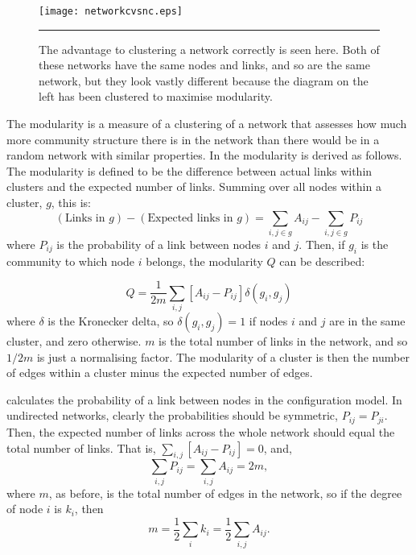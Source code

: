 \begin{figure}[htb]
  \centering
  \texttt{[image: networkcvsnc.eps]}
  \bigskip
  \rule{35em}{0.5pt}
  \caption{The advantage to clustering a network correctly is seen here.  Both 
    of these networks have the same nodes and links, and so are the same 
    network, but they look vastly different because the diagram on the left 
    has been clustered to maximise modularity.}
  \label{netclus}
\end{figure}

The modularity is a measure of a clustering of a network that assesses 
how much more community structure there is in the network than there would be 
in a random network with similar properties.  In \citep{Newman2006b,Newman2006a} the modularity is derived as follows. The modularity is defined to be the difference between actual links within clusters and the expected number of links.  Summing over all nodes within a cluster, $g$, this is:
\begin{equation}
(\text{Links in }g) - (\text{Expected links in }g) = \sum_{i,j \in g}  A_{ij} - \sum_{i,j \in g} P_{ij} 
\end{equation}
where $P_{ij}$ is the 
probability of a link between nodes $i$ and $j$. Then, if $g_i$ is the 
community to which node $i$ belongs, the modularity $Q$ can be described:

\begin{equation}
Q = \frac{1}{2m}\sum_{i,j}[A_{ij} - P_{ij}]\delta(g_i,g_j)
\end{equation}
where $\delta$ is the Kronecker delta, so $\delta(g_i,g_j)=1$ if nodes 
$i$ and $j$ are in the same cluster, and zero otherwise. $m$ is the total 
number of links in the network, and so $1/2m$ is just a normalising 
factor.  The modularity of a cluster is then the number of edges within a 
cluster minus the expected number of edges.

\citet{Newman2006b,Newman2006a} calculates the probability of a link between nodes in the configuration model.  In undirected networks, 
clearly the probabilities should be symmetric, $P_{ij} = P_{ji}$.  Then, the expected number of links across the whole network should equal the total number of links.   That is, $\sum_{i,j}[A_{ij} - P_{ij}] = 0$, and,
\begin{equation}
\sum_{i,j}P_{ij} = \sum_{i,j} A_{ij} = 2m,
\end{equation}
where $m$, as before, is the total number of edges in the network, so if the 
degree of node $i$ is $k_i$, then
\begin{equation}
m = \frac{1}{2}\sum_i k_i = \frac{1}{2}\sum_{i,j} A_{ij}.
\end{equation}

